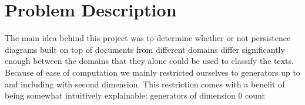 \section{Problem Description} 
\label{sec:problem_description}


The main idea behind this project was to determine whether or not persistence
diagrams built on top of documents from different domains differ significantly
enough between the domains that they alone could be used to classify the texts.
Because of ease of computation we mainly restricted ourselves to generators up
to and including with second dimension. This restriction comes with a benefit
of being somewhat intuitively explainable: generators of dimension 0 count
